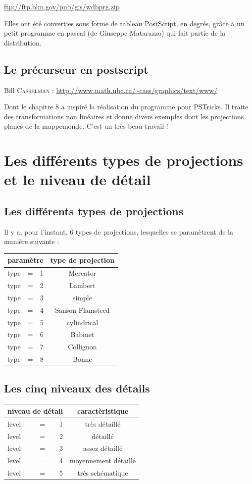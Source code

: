 \documentclass[11pt,french,BCOR10mm,DIV12,bibliography=totoc,parskip=false,
   smallheadings, headexclude,footexclude,oneside]{pst-doc}
\begin{document}
\url{ftp://ftp.blm.gov/pub/gis/wdbprg.zip}

Elles ont \'et\'e converties sous forme de tableau PostScript, en
degr\'es,
gr\^ ace à un petit programme en pascal (de Giuseppe Matarazzo) qui
fait partie de la distribution.

\subsection{Le pr\'ecurseur en postscript}
Bill \textsc{Casselman} :
\url{http://www.math.ubc.ca/~cass/graphics/text/www/}

Dont le chapitre 8 a inspir\'e la r\'ealisation du programme pour PSTricks.
Il traite des transformations non linéaires et donne divers exemples dont
les projections planes de la mappemonde. C'est un très beau travail !
\section{Les diff\'erents types de projections et le niveau de d\'etail}
\subsection{Les différents types de projections}
Il y a, pour l'instant, 6 types de projections, lesquelles se paramètrent de
la manière suivante :
\begin{center}
\renewcommand\arraystretch{2}
\begin{tabular}{|lcr|c|}\hline
\multicolumn{3}{|c|}{paramètre}&type de projection\\ \hline
type&=&1& Mercator\\ \hline
type&=&2 & Lambert\\ \hline
type&=&3 & simple\\ \hline
type&=&4 & Sanson-Flamsteed\\ \hline
type&=&5 & cylindrical\\ \hline
type&=&6 & Babinet\\ \hline
type&=&7 & Collignon\\ \hline
type&=&8 & Bonne\\ \hline
\end{tabular}
\end{center}
\subsection{Les  cinq niveaux des d\'etails}
\begin{center}
\begin{tabular}{|lcr|c|}\hline
\multicolumn{3}{|c|}{niveau de détail}& caractèristique\\ \hline
level&=&1& très détaillé\\ \hline
level&=&2 & détaillé\\ \hline
level&=&3 & assez détaillé\\ \hline
level&=&4 & moyennement détaillé\\ \hline
level&=&5 & très schématique\\ \hline
\end{tabular}
\end{center}
\end{document}
